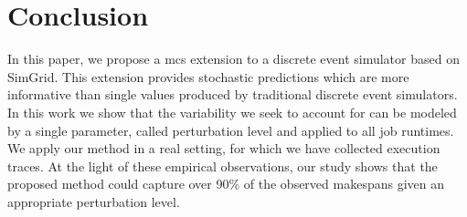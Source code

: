 \documentclass[10pt,conference,compsocconf]{IEEEtran}
\begin{document}
\section{Conclusion}
In this paper, we propose a \acl{mcs} extension  to a  discrete  event  simulator based  on
SimGrid.  This  extension provides stochastic predictions which are more
informative than single values produced by
traditional discrete  event simulators. In this work we show that the
variability we seek to account for can be modeled  by a  single parameter,
called perturbation  level and applied  to all  job runtimes. We apply
our method in  a real setting, for which we have collected  execution traces.  
At  the light of  these empirical observations, our study shows that the
proposed method could capture over 90\% of the observed makespans given  an
appropriate perturbation  level.



\end{document}

